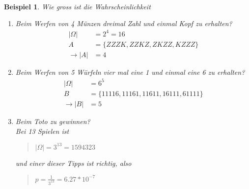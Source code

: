 \documentclass{report}
\newtheorem{myexample}{Beispiel}
\begin{document}
\begin{myexample}
Wie gross ist die Wahrscheinlichkeit
\begin{enumerate}
\item Beim Werfen von 4 Münzen dreimal Zahl und einmal Kopf zu erhalten?\\
\begin{align*}
 |\Omega| &= 2^4 = 16\\
 A &= \{ ZZZK, ZZKZ, ZKZZ, KZZZ \}\\
 \rightarrow |A| &= 4
\end{align*}
\item Beim Werfen von 5 Würfeln vier mal eine 1 und einmal eine 6 zu erhalten?
\begin{align*}
 |\Omega| &= 6^5\\
 B &= \{ 11116, 11161, 11611, 16111, 61111 \}\\
 \rightarrow |B| &= 5
\end{align*}
\item Beim Toto zu gewinnen?\\
Bei 13 Spielen ist
\begin{quote}
$|\Omega| = 3^{13} = 1594323$
\end{quote}
und einer dieser Tipps ist richtig, also
\begin{quote}
$p = \frac{1}{3^{13}} = 6.27 * 10^{-7}$
\end{quote}
\end{enumerate}
\end{myexample}
\end{document}
